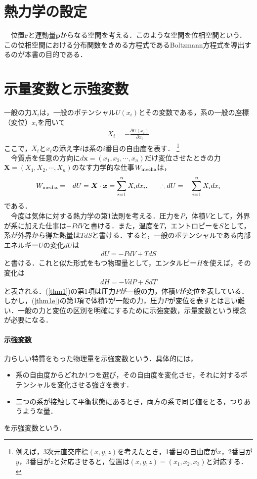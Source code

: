\section{熱力学の設定}


　位置$\bm{r}$と運動量$\bm{p}$からなる空間を考える．このような空間を位相空間という．この位相空間における分布関数をきめる方程式であるBoltzmann方程式を導出するのが本書の目的である．
\section{示量変数と示強変数}
一般の力$X_i$は，一般のポテンシャル$U(x_i)$とその変数である，系の一般の座標（変位）$x_i$を用いて
\begin{align}\label{force}
X_i=-\frac{\partial U(x_i)}{\partial x_i}
\end{align}
ここで，$X_i$と$x_i$の添え字$i$は系の$i$番目の自由度を表す．
\footnote{%
例えば，3次元直交座標$(x,y,z)$を考えたとき，1番目の自由度が$x$，2番目が$y$，3番目が$z$と対応させると，位置は$(x,y,z)=(x_1,x_2,x_3)$と対応する．}\\
　今質点を任意の方向に$d\bm{x}=(x_1,x_2,\cdots,x_n)$だけ変位させたときの力$\bm{X}=(X_1,X_2,\cdots,X_n)$のなす力学的な仕事$W_{\rm{mecha}}$は，
\begin{align}\label{work}
W_{\rm{mecha}}=-dU=\bm{X}\cdot\bm{x}=\displaystyle\sum_{i=1}^{n}X_idx_i,\ \ \ \ \ \therefore dU=-\displaystyle\sum_{i=1}^{n}X_idx_i
\end{align}
である．\\
　今度は気体に対する熱力学の第1法則を考える．圧力を$P$，体積$V$として，外界が系に加えた仕事は$-PdV$と書ける．また，温度を$T$，エントロピーを$S$として，系が外界から得た熱量は$TdS$と書ける．すると，一般のポテンシャルである内部エネルギー$U$の変化$dU$は
\begin{align}\label{thm1}
dU=-PdV+TdS
\end{align}
と書ける．これと似た形式をもつ物理量として，エンタルピー$H$を使えば，その変化は
\begin{align}\label{thm1e}
dH=-VdP+SdT
\end{align}
と表される．(\ref{thm1})の第1項は圧力$P$が一般の力，体積$V$が変位を表している．しかし，(\ref{thm1e})の第1項で体積$V$が一般の力，圧力$P$が変位を表すとは言い難い．一般の力と変位の区別を明確にするために示強変数，示量変数という概念が必要になる．


%
\paragraph{示強変数}
力らしい特質をもった物理量を示強変数という．具体的には，
\begin{itemize}
  \item 系の自由度からどれか1つを選び，その自由度を変化させ，それに対するポテンシャルを変化させる強さを表す．
  \item 二つの系が接触して平衡状態にあるとき，両方の系で同じ値をとる，つりあうような量．
\end{itemize}
を示強変数という．

